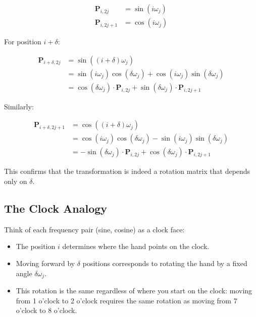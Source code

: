 \documentclass{article}
\begin{document}
\begin{align}
\mathbf{P}_{i,2j} &= \sin(i \omega_j) \\
\mathbf{P}_{i,2j+1} &= \cos(i \omega_j)
\end{align}

For position $i + \delta$:

\begin{align}
\mathbf{P}_{i+\delta,2j} &= \sin((i + \delta) \omega_j) \\
&= \sin(i \omega_j) \cos(\delta \omega_j) + \cos(i \omega_j) \sin(\delta \omega_j) \\
&= \cos(\delta \omega_j) \cdot \mathbf{P}_{i,2j} + \sin(\delta \omega_j) \cdot \mathbf{P}_{i,2j+1}
\end{align}

Similarly:

\begin{align}
\mathbf{P}_{i+\delta,2j+1} &= \cos((i + \delta) \omega_j) \\
&= \cos(i \omega_j) \cos(\delta \omega_j) - \sin(i \omega_j) \sin(\delta \omega_j) \\
&= -\sin(\delta \omega_j) \cdot \mathbf{P}_{i,2j} + \cos(\delta \omega_j) \cdot \mathbf{P}_{i,2j+1}
\end{align}

This confirms that the transformation is indeed a rotation matrix that depends only on $\delta$.

\subsection{The Clock Analogy}

Think of each frequency pair (sine, cosine) as a clock face:
\begin{itemize}
\item The position $i$ determines where the hand points on the clock.
\item Moving forward by $\delta$ positions corresponds to rotating the hand by a fixed angle $\delta \omega_j$.
\item This rotation is the same regardless of where you start on the clock: moving from 1 o'clock to 2 o'clock requires the same rotation as moving from 7 o'clock to 8 o'clock.
\end{itemize}
\end{document}
